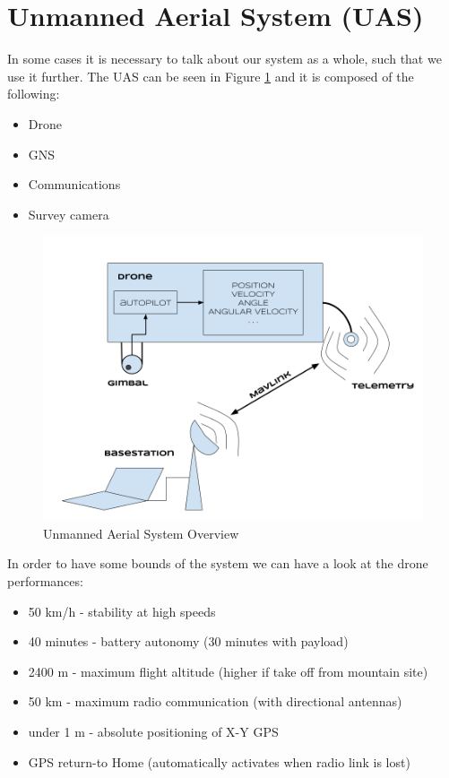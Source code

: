 \section{Unmanned Aerial System (UAS)}\label{sec:uas}




In some cases it is necessary to talk about our system as a whole, such that we use it further. The UAS can be seen in Figure \ref{fig:uas} and it is composed of the following:
\begin{itemize}
	\item Drone
	\item GNS
	\item Communications
	\item Survey camera
\end{itemize}

\begin{figure}[H]
	\centering
	\includegraphics[scale=0.33]{figures/uas.png}
	\caption{Unmanned Aerial System Overview}
	\label{fig:uas}
\end{figure}

In order to have some bounds of the system we can have a look at the drone performances:
\begin{itemize}
	\item 50 km/h - stability at high speeds 
	\item 40 minutes - battery autonomy (30 minutes with payload)
	\item 2400 m - maximum flight altitude (higher if take off from mountain site)
	\item 50 km - maximum radio communication (with directional antennas)
	\item under 1 m - absolute positioning of X-Y GPS
	\item GPS return-to Home (automatically activates when radio link is lost)
\end{itemize}

